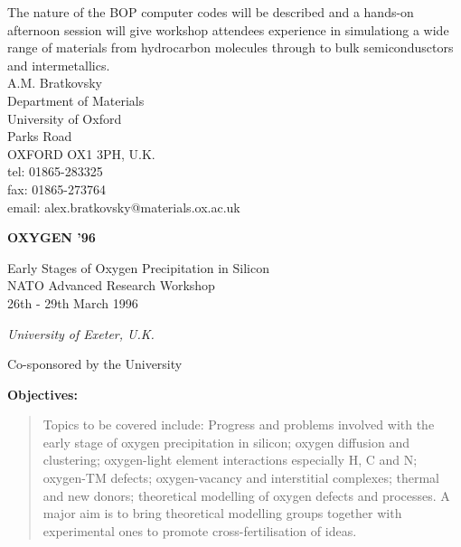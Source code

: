 {\noindent
The nature of the BOP computer codes will be described and a
hands-on afternoon session will give workshop attendees experience
in simulationg a wide range of materials from hydrocarbon molecules
through to bulk semicondusctors and intermetallics. \\

\noindent
A.M. Bratkovsky \\
Department of Materials \\
University of Oxford \\
Parks Road \\
OXFORD OX1 3PH, U.K. \\
tel: 01865-283325 \\
fax: 01865-273764 \\
email: alex.bratkovsky@materials.ox.ac.uk \\
\newpage
\null
\begin{center}
{\Large{\bf 			OXYGEN '96}}

{\large{\bf

                Early Stages of Oxygen Precipitation in Silicon\\
                        NATO Advanced Research Workshop\\
                             26th - 29th March 1996}}

{\large{\it                University of Exeter, U.K.

                         Co-sponsored by the University}}
\end{center}

{\centering{
------------------------------------------------------------------------------}}

{\large{\bf Objectives:}}

\begin{quotation} \noindent
     Topics to be covered include: Progress and problems involved with the
     early stage of oxygen precipitation in silicon; oxygen diffusion and
     clustering; oxygen-light element interactions especially H, C and N;
     oxygen-TM defects; oxygen-vacancy and interstitial complexes; thermal and
     new donors; theoretical modelling of oxygen defects and processes. A major
     aim is to bring theoretical modelling groups together with experimental
     ones to promote cross-fertilisation of ideas.
\end{quotation}

}
